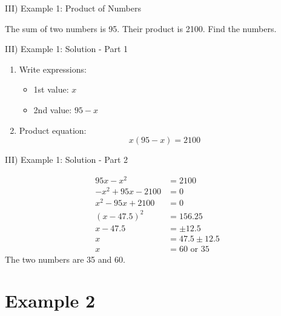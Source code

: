 \documentclass[aspectratio=169]{beamer}
\begin{document}
\begin{frame}{III) Example 1: Product of Numbers}
    \begin{tcolorbox}[colback=lightgray,colframe=primary,title=Problem]
        \footnotesize
        The sum of two numbers is 95. Their product is 2100. Find the numbers.
    \end{tcolorbox}
\end{frame}

\begin{frame}{III) Example 1: Solution - Part 1}
    \begin{tcolorbox}[colback=lightgray,colframe=accent,title=Solution - Part 1]
        \footnotesize
        \begin{enumerate}
            \item Write expressions:
            \begin{itemize}
                \item 1st value: $x$
                \item 2nd value: $95 - x$
            \end{itemize}
            \item Product equation:
            \[x(95 - x) = 2100\]
        \end{enumerate}
    \end{tcolorbox}
\end{frame}

\begin{frame}{III) Example 1: Solution - Part 2}
    \begin{tcolorbox}[colback=lightgray,colframe=accent,title=Solution - Part 2]
        \footnotesize
        \begin{align*}
            95x - x^2 &= 2100\\
            -x^2 + 95x - 2100 &= 0\\
            x^2 - 95x + 2100 &= 0\\
            (x - 47.5)^2 &= 156.25\\
            x - 47.5 &= \pm 12.5\\
            x &= 47.5 \pm 12.5\\
            x &= 60 \text{ or } 35
        \end{align*}
        The two numbers are 35 and 60.
    \end{tcolorbox}
\end{frame}

\section{Example 2}
\end{document}
